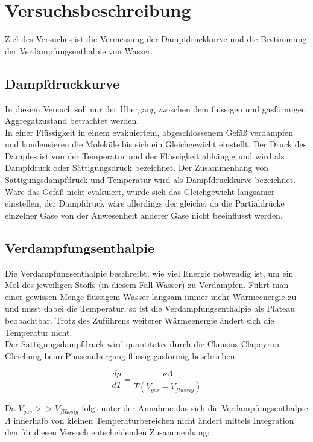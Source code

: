 \documentclass[12pt,a4paper]{article}
\author{Tim}
\begin{document}
\newpage
\tableofcontents
\newpage

\section{Versuchsbeschreibung}
Ziel des Versuches ist die Vermessung der Dampfdruckkurve und die Bestimmung der Verdampfungsenthalpie von Wasser.\\

\subsection{Dampfdruckkurve}
In diesem Versuch soll nur der Übergang zwischen dem flüssigen und gasförmigen Aggregatzustand betrachtet werden. \\
In einer Flüssigkeit in einem evakuiertem, abgeschlossenem Gefäß verdampfen und kondensieren die Moleküle bis sich ein Gleichgewicht einstellt. Der Druck des Dampfes ist von der Temperatur und der Flüssigkeit abhängig und wird als Dampfdruck oder Sättigungsdruck bezeichnet. Der Zusammenhang von Sättigungsdampfdruck und Temperatur wird als Dampfdruckkurve bezeichnet. Wäre das Gefäß nicht evakuiert, würde sich das Gleichgewicht langsamer einstellen, der Dampfdruck wäre allerdings der gleiche, da die Partialdrücke einzelner Gase von der Anwesenheit anderer Gase nicht beeinflusst werden.

\subsection{Verdampfungsenthalpie}
Die Verdampfungsenthalpie beschreibt, wie viel Energie notwendig ist, um ein Mol des jeweiligen Stoffs (in diesem Fall Wasser) zu Verdampfen. Führt man einer gewissen Menge flüssigem Wasser langsam immer mehr Wärmeenergie zu und misst dabei die Temperatur, so ist die Verdampfungsenthalpie als Plateau beobachtbar. Trotz des Zuführens weiterer Wärmeenergie ändert sich die Temperatur nicht. \\

Der Sättigungsdampfdruck wird quantitativ durch die Clausius-Clapeyron-Gleichung beim Phasenübergang flüssig-gasförmig beschrieben.

\begin{equation}
\frac{dp}{dT}=\frac{\nu \Lambda}{T(V_{gas}-			V_{flüssig})}
\end{equation}

Da $V_{gas} >> V_{flüssig}$ folgt unter der Annahme das sich die Verdampfungsenthalpie $\Lambda$ innerhalb von kleinen Temperaturbereichen nicht ändert mittels Integration den für diesen Versuch entscheidenden Zusammenhang:
\end{document}
